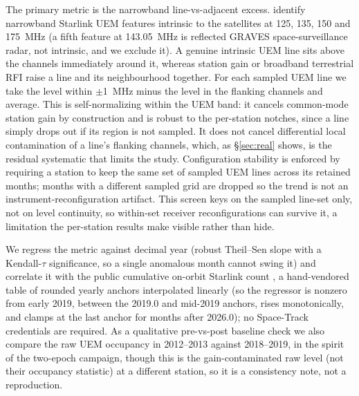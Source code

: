 \documentclass[twocolumn]{aastex631}
\begin{document}
The primary metric is the narrowband line-vs-adjacent excess. \citet{divruno2023} identify
narrowband Starlink UEM features intrinsic to the satellites at 125, 135, 150 and 175~MHz (a
fifth feature at 143.05~MHz is reflected GRAVES space-surveillance radar, not intrinsic, and we
exclude it). A genuine intrinsic UEM line sits above the channels immediately around it,
whereas station gain or broadband terrestrial RFI raise a line and its neighbourhood together. For
each sampled UEM line we take the level within $\pm$1~MHz minus the level in the flanking channels
and average. This is self-normalizing within the UEM band: it cancels common-mode
station gain by construction and is robust to the per-station notches, since a line simply drops out
if its region is not sampled. It does not cancel differential local contamination of a line's
flanking channels, which, as \S\ref{sec:real} shows, is the residual systematic that
limits the study. Configuration stability is enforced by requiring a station to keep the same
set of sampled UEM lines across its retained months; months with a different sampled grid are
dropped so the trend is not an instrument-reconfiguration artifact. This screen keys on the sampled
line-set only, not on level continuity, so within-set receiver reconfigurations can survive it, a
limitation the per-station results make visible rather than hide.

We regress the metric against decimal year (robust Theil--Sen slope with a
Kendall-$\tau$ significance, so a single anomalous month cannot swing it) and correlate it with the
public cumulative on-orbit Starlink count \citep{planet4589}, a hand-vendored table of rounded
yearly anchors interpolated linearly (so the regressor is nonzero from early 2019, between the
2019.0 and mid-2019 anchors, rises monotonically, and clamps at the last anchor for months
after 2026.0); no Space-Track credentials are required. As a qualitative pre-vs-post
baseline check we also compare the raw UEM occupancy in 2012--2013 against 2018--2019, in the spirit
of the two-epoch \citet{prieto2020} campaign, though this is the gain-contaminated raw level (not
their occupancy statistic) at a different station, so it is a consistency note, not a reproduction.
\end{document}

